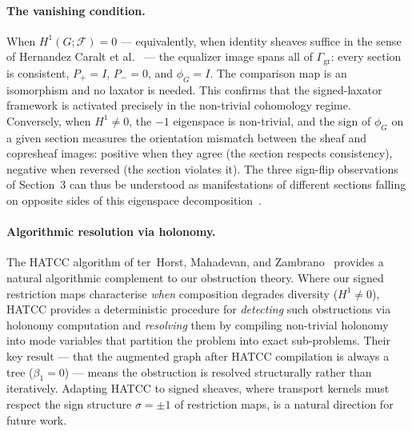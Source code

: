\paragraph{The vanishing condition.}
When $H^1(G;\mathcal{F}) = 0$ --- equivalently, when identity sheaves
suffice in the sense of Hernandez Caralt et
al.~\cite{hernandez2026identity} --- the equalizer image spans all of
$\Gamma_{\mathrm{gr}}$: every section is consistent, $P_+ = I$,
$P_- = 0$, and $\phi_G = I$.  The comparison map is an isomorphism
and no laxator is needed.  This confirms that the signed-laxator
framework is activated precisely in the non-trivial cohomology regime.
Conversely, when $H^1 \neq 0$, the $-1$ eigenspace is non-trivial,
and the sign of $\phi_G$ on a given section measures the orientation
mismatch between the sheaf and copresheaf images: positive when they
agree (the section respects consistency), negative when reversed (the
section violates it).  The three sign-flip observations of Section~3
can thus be understood as manifestations of different sections falling
on opposite sides of this eigenspace
decomposition~\cite{hajij2025copresheaf,hernandez2026identity,sloboda2026composition,ghrist2026cup,hanks2025relative}.

\paragraph{Algorithmic resolution via holonomy.}
The HATCC algorithm of ter~Horst, Mahadevan, and
Zambrano~\cite{terhorst2026categorical} provides a natural algorithmic
complement to our obstruction theory.  Where our signed restriction maps
characterise \emph{when} composition degrades diversity ($H^1 \neq 0$),
HATCC provides a deterministic procedure for \emph{detecting} such
obstructions via holonomy computation and \emph{resolving} them by
compiling non-trivial holonomy into mode variables that partition the
problem into exact sub-problems.  Their key result --- that the augmented
graph after HATCC compilation is always a tree ($\beta_1 = 0$) --- means
the obstruction is resolved structurally rather than iteratively.
Adapting HATCC to signed sheaves, where transport kernels must respect
the sign structure $\sigma = \pm 1$ of restriction maps, is a natural
direction for future work.

